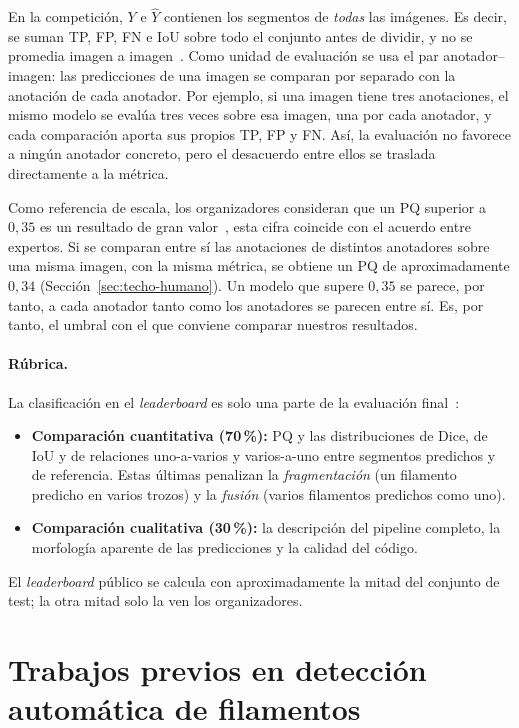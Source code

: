 En la competición, $Y$ e $\hat Y$ contienen los segmentos de
\emph{todas} las imágenes. Es decir, se suman TP, FP, FN e IoU sobre todo
el conjunto antes de dividir, y no se promedia imagen a
imagen~\cite{kaggle2026}. Como unidad de evaluación se usa el par
anotador--imagen: las predicciones de una imagen se comparan por separado
con la anotación de cada anotador. Por ejemplo, si una imagen tiene tres
anotaciones, el mismo modelo se evalúa tres veces sobre esa imagen, una por
cada anotador, y cada comparación aporta sus propios TP, FP y FN. Así, la
evaluación no favorece a ningún anotador concreto, pero el desacuerdo entre
ellos se traslada directamente a la métrica.

Como referencia de escala, los organizadores consideran que un PQ superior a
$0{,}35$ es un resultado de gran valor~\cite{kaggle2026}, esta cifra coincide con el acuerdo entre expertos. Si se
comparan entre sí las anotaciones de distintos anotadores sobre una misma
imagen, con la misma métrica, se obtiene un PQ de aproximadamente $0{,}34$
(Sección~\ref{sec:techo-humano}). Un modelo que supere $0{,}35$ se parece,
por tanto, a cada anotador tanto como los anotadores se parecen entre sí. Es, por tanto, el umbral con el que conviene comparar nuestros resultados.

\paragraph{Rúbrica.} La clasificación en el \emph{leaderboard} es solo una
parte de la evaluación final~\cite{kaggle2026}:
\begin{itemize}
  \item \textbf{Comparación cuantitativa (70\,\%):} PQ y las
  distribuciones de Dice, de IoU y de relaciones uno-a-varios y
  varios-a-uno entre segmentos predichos y de referencia. Estas últimas
  penalizan la \emph{fragmentación} (un filamento predicho en varios
  trozos) y la \emph{fusión} (varios filamentos predichos como uno).
  \item \textbf{Comparación cualitativa (30\,\%):} la descripción del
  pipeline completo, la morfología aparente de las predicciones y la
  calidad del código.
\end{itemize}
El \emph{leaderboard} público se calcula con aproximadamente la mitad del
conjunto de test; la otra mitad solo la ven los organizadores.

\section{Trabajos previos en detección automática de filamentos}
\label{sec:estado-arte}

